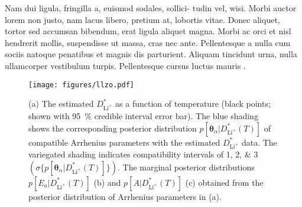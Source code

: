 \documentclass[reprint,superscriptaddress,nobibnotes,amsmath,amssymb,aps,hidelinks]{revtex4-2}
\begin{document}
Nam dui ligula, fringilla a, euismod sodales, sollici- tudin vel, wisi.
Morbi auctor lorem non justo, nam lacus libero, pretium at, lobortis vitae.
Donec aliquet, tortor sed accumsan bibendum, erat ligula aliquet magna.
Morbi ac orci et nisl hendrerit mollis, suspendisse ut massa, cras nec ante.
Pellentesque a nulla cum sociis natoque penatibus et magnis dis parturient.
Aliquam tincidunt urna, nulla ullamcorper vestibulum turpis.
Pellentesque cursus luctus mauris \citep{Luger2021}.

%
\begin{figure}
    \centering
    \texttt{[image: figures/llzo.pdf]}
    \caption{(a) The estimated $D^{*}_{\mathrm{Li^+}}$ as a function of temperature (black points; shown with \SI{95}{\percent} credible interval error bar). The blue shading shows the corresponding posterior distribution $p[\bm{\theta}_{\alpha} | D^{*}_{\mathrm{Li^+}}(T)]$ of compatible Arrhenius parameters with the estimated $D^*_{\mathrm{Li^+}}$ data. The variegated shading indicates compatibility intervals of \numlist{1;2;3} $(\sigma\{p[\bm{\theta}_{\alpha} | D^{*}_{\mathrm{Li^+}}(T)]\})$. The marginal posterior distributions $p[E_a | D^*_{\mathrm{Li^+}}(T)]$ (b) and $p[A | D^{*}_{\mathrm{Li^+}}(T)]$ (c) obtained from the posterior distribution of Arrhenius parameters in (a).}
    \label{fig:llzo}
\end{figure}
%


\end{document}
